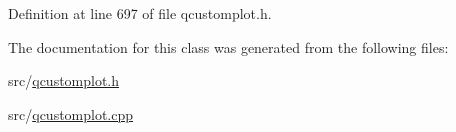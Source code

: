 Definition at line 697 of file qcustomplot.\-h.



The documentation for this class was generated from the following files\-:\begin{DoxyCompactItemize}
\item 
src/\hyperlink{qcustomplot_8h}{qcustomplot.\-h}\item 
src/\hyperlink{qcustomplot_8cpp}{qcustomplot.\-cpp}\end{DoxyCompactItemize}
